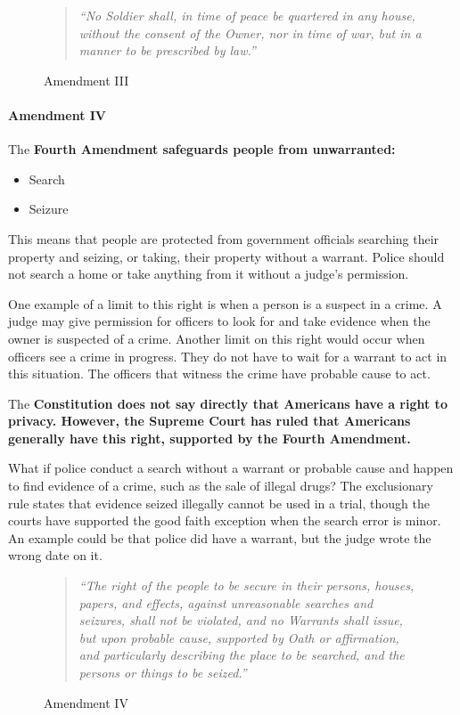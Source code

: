 \begin{figure}[h]
    \begin{quote}
        \it{“No Soldier shall, in time of peace be quartered in any house, without the consent of the Owner, nor in time of war, but in a manner to be prescribed by law.”}
    \end{quote}
    \caption{Amendment III}
\end{figure}

\paragraph{Amendment IV}

The \bf{Fourth Amendment} safeguards people from unwarranted:

\begin{itemize}
    \item Search
    \item Seizure
\end{itemize}

This means that people are protected from government officials searching their property and seizing, or taking, their property without a warrant. Police should not search a home or take anything from it without a judge's permission.

One example of a limit to this right is when a person is a suspect in a crime. A judge may give permission for officers to look for and take evidence when the owner is suspected of a crime. Another limit on this right would occur when officers see a crime in progress. They do not have to wait for a warrant to act in this situation. The officers that witness the crime have probable cause to act.

The \bf{Constitution} does not say directly that Americans have a right to privacy. However, the \bf{Supreme Court} has ruled that Americans generally have this right, supported by the Fourth Amendment.

What if police conduct a search without a warrant or probable cause and happen to find evidence of a crime, such as the sale of illegal drugs? The exclusionary rule states that evidence seized illegally cannot be used in a trial, though the courts have supported the good faith exception when the search error is minor. An example could be that police did have a warrant, but the judge wrote the wrong date on it.

\begin{figure}[h]
    \begin{quote}
        \it{“The right of the people to be secure in their persons, houses, papers, and effects, against unreasonable searches and seizures, shall not be violated, and no Warrants shall issue, but upon probable cause, supported by Oath or affirmation, and particularly describing the place to be searched, and the persons or things to be seized.”}
    \end{quote}
    \caption{Amendment IV}
\end{figure}

